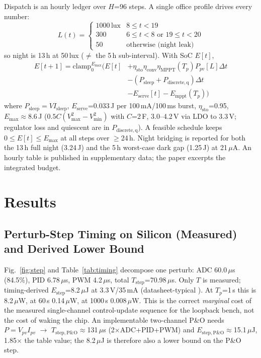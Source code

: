 \documentclass[10pt, conference, letterpaper]{IEEEtran}
\begin{document}
Dispatch is an hourly ledger over $H$=96 steps. A single office profile drives every number:
\begin{equation}
L(t)=\begin{cases}
1000\,\mathrm{lux} & 8\le t<19\\
300 & 6\le t<8 \text{ or } 19\le t<20\\
50 & \text{otherwise (night leak)}
\end{cases}
\end{equation}
so night is 13\,h at 50\,lux ($\ne$ the 5\,h sub-interval). With SoC $E[t]$,
{\footnotesize
\begin{equation}
\begin{aligned}
E[t+1] = \mathrm{clamp}_{0}^{E_{\max}}\!\bigl(E[t] &+ \eta_{\mathrm{sto}}\eta_{\mathrm{conv}}\eta_{\mathrm{MPPT}}(T_p)P_{pv}[L]\Delta t \\
&- (P_{\mathrm{sleep}}+P_{\mathrm{discrete,q}})\Delta t \\
&- E_{\mathrm{serve}}[t] - E_{\mathrm{mppt}}(T_p)\bigr)
\end{aligned}
\label{eq:dispatch}
\end{equation}}
where $P_{\mathrm{sleep}}=VI_{\mathrm{sleep}}$, $E_{\mathrm{serve}}$=0.033\,J per 100\,mA/100\,ms burst, $\eta_{\mathrm{sto}}$=0.95, $E_{\max}\approx8.6$\,J ($0.5C(V_{\max}^2-V_{\min}^2)$ with $C$=2\,F, 3.0--4.2\,V via LDO to 3.3\,V; regulator loss and quiescent are in $P_{\mathrm{discrete,q}}$). A feasible schedule keeps $0\le E[t]\le E_{\max}$ at all steps over $\ge$24\,h. Night bridging is reported for both the 13\,h full night (3.24\,J) and the 5\,h worst-case dark gap (1.25\,J) at 21\,$\mu$A. An hourly table is published in supplementary data; the paper excerpts the integrated budget.

\section{Results}

\subsection{Perturb-Step Timing on Silicon (Measured) and Derived Lower Bound}
\label{sec:step}

Fig.~\ref{fig:step} and Table~\ref{tab:timing} decompose one perturb: ADC 60.0\,$\mu$s (84.5\%), PID 6.78\,$\mu$s, PWM 4.2\,$\mu$s, total $T_{\mathrm{step}}$=70.98\,$\mu$s. Only $T$ is measured; timing-derived $E_{\mathrm{step}}$=8.2\,$\mu$J at 3.3\,V/35\,mA (datasheet-typical \cite{espressif_s3_datasheet}). At $T_p$=1\,s this is 8.2\,$\mu$W, at 60\,s 0.14\,$\mu$W, at 1000\,s 0.008\,$\mu$W. This is the correct \emph{marginal} cost of the measured single-channel control-update sequence for the loopback bench, not the cost of waking the chip. An implementable two-channel P\&O needs $P=V_{pv}I_{pv}$ $\rightarrow$ $T_{\mathrm{step,P\&O}}\approx$131\,$\mu$s (2$\times$ADC+PID+PWM) and $E_{\mathrm{step,P\&O}}\approx$15.1\,$\mu$J, 1.85$\times$ the table value; the 8.2\,$\mu$J is therefore also a lower bound on the P\&O step.
\end{document}
